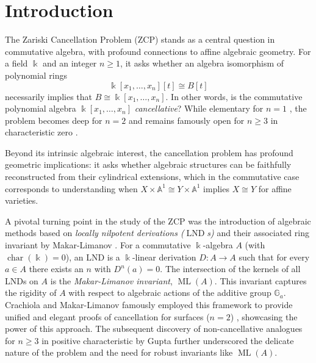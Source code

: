 \documentclass{amsart}
\theoremstyle{plain}
\numberwithin{theorem}{section}
\numberwithin{equation}{theorem}
\theoremstyle{definition}
\DeclareMathOperator{\LND}{LND}
\DeclareMathOperator{\ML}{ML}
\begin{document}






\section*{Introduction}
\label{xxsec0}

The Zariski Cancellation Problem (ZCP) stands as a central question in commutative 
algebra, with profound connections to affine algebraic geometry. For a field 
$\Bbbk$ and an integer $n\ge 1$, it asks whether an algebra isomorphism of 
polynomial rings
$$
\Bbbk[x_1,\dots,x_n][t] \cong B[t]
$$
necessarily implies that $B \cong \Bbbk[x_1,\dots,x_n]$. In other words, is the 
commutative polynomial algebra $\Bbbk[x_1,\dots,x_n]$ \emph{cancellative}? While 
elementary for $n = 1$ \cite{AEH}, the problem becomes deep for $n = 2$ 
\cite{Fu, MS, Ru} and remains famously open for $n \geq 3$ in characteristic zero 
\cite{ Gu3,Kr}.

Beyond its intrinsic algebraic interest, the cancellation problem has profound geometric implications: it asks whether algebraic structures can be faithfully reconstructed from their cylindrical extensions, which in the commutative case corresponds to understanding when $X \times \mathbb{A}^1 \cong Y \times \mathbb{A}^1$
implies $X \cong Y$ for affine varieties.


A pivotal turning point in the study of the ZCP was the introduction of algebraic 
methods based on \emph{locally nilpotent derivations ($\LND$s)} and their 
associated ring invariant by Makar-Limanov \cite{ML}. For a commutative 
$\Bbbk$-algebra $A$ (with $\operatorname{char}(\Bbbk)=0$), an LND is a 
$\Bbbk$-linear derivation $D: A \to A$ such that for every $a \in A$ there exists 
an $n$ with $D^n(a)=0$. The intersection of the kernels of all LNDs on $A$ is the 
\emph{Makar-Limanov invariant}, $\ML(A)$. This invariant captures 
the rigidity of $A$ with respect to algebraic actions of the additive group 
$\mathbb{G}_a$. Crachiola and Makar-Limanov famously employed this framework to 
provide unified and elegant proofs of cancellation for surfaces ($n=2$) 
\cite{Crachiola2009, CM}, showcasing the power of this approach. The subsequent 
discovery of non-cancellative analogues for $n\ge 3$ in positive characteristic 
by Gupta \cite{Gu1,Gu2} further underscored the delicate nature of the problem 
and the need for robust invariants like $\ML(A)$.
\end{document}
